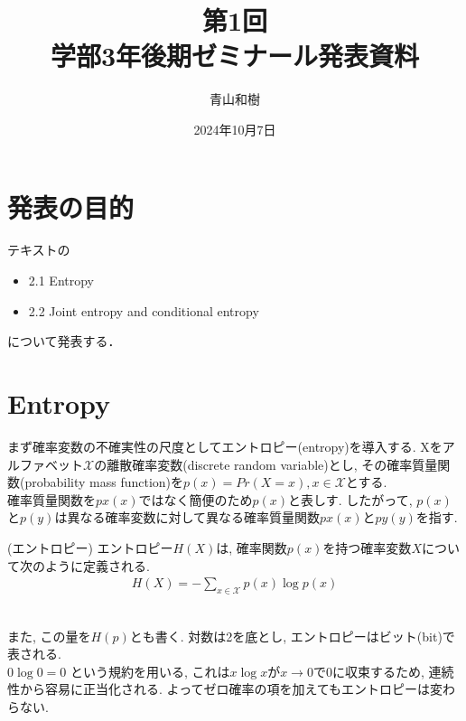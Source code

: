 \documentclass[a4j]{jsarticle}
\title{第1回\\学部3年後期ゼミナール発表資料}
\author{青山和樹}
\date{2024年10月7日}
\begin{document}
\maketitle

\section*{発表の目的}
テキスト\cite{text}の
\begin{itemize}
	\item 2.1 Entropy
	\item 2.2 Joint entropy and conditional entropy
\end{itemize}
について発表する．


\tableofcontents

\clearpage


\section{Entropy}

まず確率変数の不確実性の尺度としてエントロピー(entropy)を導入する. Xをアルファベット$\mathcal{X}$の離散確率変数(discrete random variable)とし, その確率質量関数(probability mass function)を$p(x) = Pr(X = x), x \in \mathcal{X}$とする.\\

 確率質量関数を$px(x)$ではなく簡便のため$p(x)$と表しす. したがって, $p(x)$と$p(y)$は異なる確率変数に対して異なる確率質量関数$px(x)$と$py(y)$を指す.\\

\begin{itembox}[l]{ (エントロピー)}
	エントロピー$H(X)$は, 確率関数$p(x)$を持つ確率変数$X$について次のように定義される.
	\begin{align}
		H(X) = - \sum_{x \in \mathcal{X}} p(x) \log p(x)
	\end{align}
\end{itembox}\\

また, この量を$H(p)$とも書く. 対数は2を底とし, エントロピーはビット(bit)で表される.\\

 $0 \log 0 = 0$ という規約を用いる, これは$x \log x$が$x \rightarrow 0$で0に収束するため, 連続性から容易に正当化される. よってゼロ確率の項を加えてもエントロピーは変わらない.\\
\end{document}
